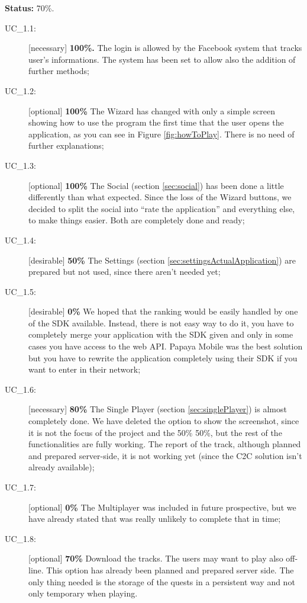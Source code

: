 \textbf{Status:}  70\%.
		\begin{description}
			\item[UC\_1.1:] [necessary] \textbf{100\%.} The login is allowed by the Facebook system that tracks user's informations. The system has been set to allow also the addition of further methods;
			\item[UC\_1.2:] [optional] \textbf{100\%} The Wizard has changed with only a simple screen showing how to use the program the first time that the user opens the application, as you can see in Figure \ref{fig:howToPlay}. There is no need of further explanations;
			\item[UC\_1.3:] [optional] \textbf{100\%} The Social  (section \ref{sec:social}) has been done a little differently than what expected. Since the loss of the Wizard buttons, we decided to split the social into ``rate the application'' and everything else, to make things easier. Both are completely done and ready;
			\item[UC\_1.4:] [desirable] \textbf{50\%} The Settings  (section \ref{sec:settingsActualApplication}) are prepared but not used, since there aren't needed yet;
			\item[UC\_1.5:] [desirable] \textbf{0\%} We hoped that the ranking would be easily handled by one of the SDK available. Instead, there is not easy way to do it, you have to completely merge your application with the SDK given and only in some cases you have access to the web API. Papaya Mobile was the best solution but you have to rewrite the application completely using their SDK if you want to enter in their network;
			\item[UC\_1.6:] [necessary] \textbf{80\%} The Single Player (section \ref{sec:singlePlayer}) is almost completely done. We have deleted the option to show the screenshot, since it is not the focus of the project and the 50\% 50\%, but the rest of the functionalities are fully working. The report of the track, although planned and prepared server-side, it is not working yet (since the C2C solution isn't already available);
			\item[UC\_1.7:] [optional] \textbf{0\%} The Multiplayer was included in future prospective, but we have already stated that was really unlikely to complete that in time;
			\item[UC\_1.8:] [optional] \textbf{70\%} Download the tracks. The users may want to play also off-line. This option has already been planned and prepared server side. The only thing needed is the storage of the quests in a persistent way and not only temporary when playing.
		\end{description}

